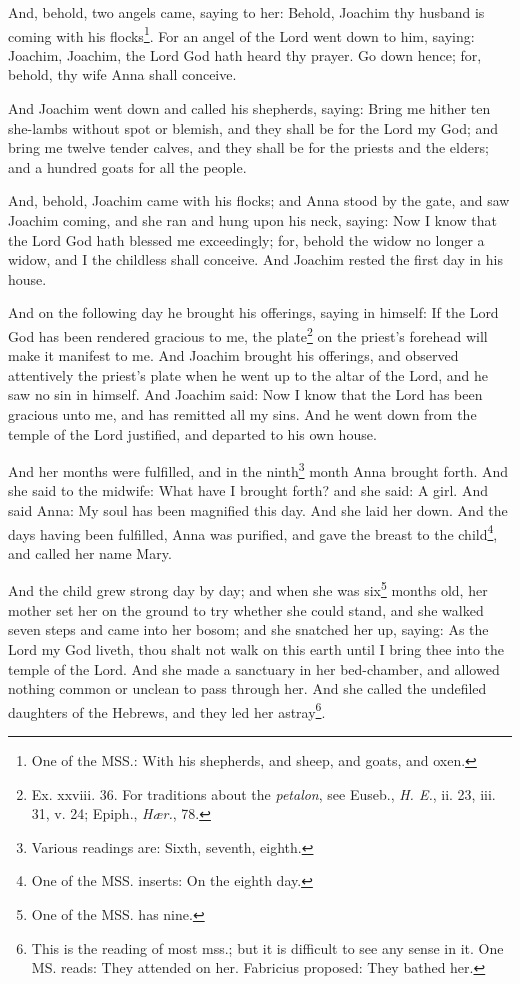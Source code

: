 \pend\pstart
And, behold, two angels came, saying to her: Behold, Joachim thy husband is coming with his
flocks\footnote{One of the MSS.: With his shepherds, and sheep, and goats, and oxen.}. For an angel of the Lord went down to him, saying: Joachim, Joachim, the Lord God hath heard thy prayer. Go down hence; for, behold, thy wife Anna shall conceive.

\pend\pstart
And Joachim went down and called his shepherds, saying: Bring me hither ten she-lambs without spot or blemish, and they shall be for the Lord my God; and bring me twelve tender calves, and they shall be for the priests and the elders; and a hundred goats for all the people.

\pend\pstart
And, behold, Joachim came with his flocks; and Anna stood by the gate, and saw Joachim coming, and she ran and hung upon his neck, saying: Now I know that the Lord God hath blessed me exceedingly; for, behold the widow no longer a widow, and I the childless shall conceive. And Joachim rested the first day in his house.

\pend\pstart
{}

\pend\pstart
And on the following day he brought his offerings, saying in himself: If the Lord God has been rendered gracious to me, the plate\footnote{Ex. xxviii. 36. For traditions about the \textit{petalon}, see Euseb., \textit{H. E.}, ii. 23, iii. 31, v. 24; Epiph., \textit{Hær.}, 78.} on the priest's forehead will make it manifest to me. And Joachim brought his offerings, and observed attentively the priest's plate when he went up to the altar of the Lord, and he saw no sin in himself. And Joachim said: Now I know that the Lord has been gracious unto me, and has remitted all my sins. And he went down from the temple of the Lord justified, and departed to his own house.

\pend\pstart
And her months were fulfilled, and in the ninth\footnote{Various readings are: Sixth, seventh, eighth.} month Anna brought forth. And she said to the midwife: What have I brought forth? and she said: A girl. And said Anna: My soul has been magnified this day. And she laid her down. And the days having been fulfilled, Anna was purified, and gave the breast to the child\footnote{One of the MSS. inserts: On the eighth day.}, and called her name Mary.

\pend\pstart
{}

\pend\pstart
And the child grew strong day by day; and when she was six\footnote{One of the MSS. has nine.} months old, her mother set her on the ground to try whether she could stand, and she walked seven steps and came into her bosom; and she snatched her up, saying: As the Lord my God liveth, thou shalt not walk on this earth until I bring thee into the temple of the Lord. And she made a sanctuary in her bed-chamber, and allowed nothing common or unclean to pass through her. And she called the undefiled daughters of the Hebrews, and they led her astray\footnote{This is the reading of most mss.; but it is difficult to see any sense in it. One MS. reads: They attended on her. Fabricius proposed: They bathed her.}.


